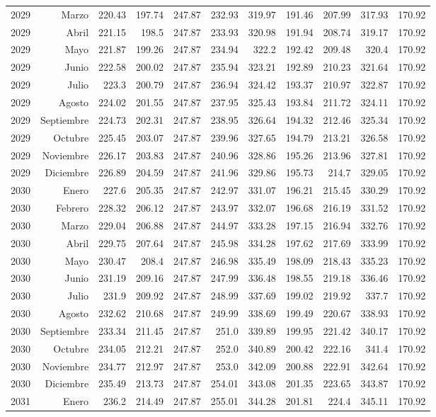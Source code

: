 \documentclass{article}%
\begin{document}
\begin{longtable}{|l r|r|r|r|r|r|r|r|r|r|}
2029&Marzo&220.43&197.74&247.87&232.93&319.97&191.46&207.99&317.93&170.92\\%
2029&Abril&221.15&198.5&247.87&233.93&320.98&191.94&208.74&319.17&170.92\\%
2029&Mayo&221.87&199.26&247.87&234.94&322.2&192.42&209.48&320.4&170.92\\%
2029&Junio&222.58&200.02&247.87&235.94&323.21&192.89&210.23&321.64&170.92\\%
2029&Julio&223.3&200.79&247.87&236.94&324.42&193.37&210.97&322.87&170.92\\%
2029&Agosto&224.02&201.55&247.87&237.95&325.43&193.84&211.72&324.11&170.92\\%
2029&Septiembre&224.73&202.31&247.87&238.95&326.64&194.32&212.46&325.34&170.92\\%
2029&Octubre&225.45&203.07&247.87&239.96&327.65&194.79&213.21&326.58&170.92\\%
2029&Noviembre&226.17&203.83&247.87&240.96&328.86&195.26&213.96&327.81&170.92\\%
2029&Diciembre&226.89&204.59&247.87&241.96&329.86&195.73&214.7&329.05&170.92\\%
2030&Enero&227.6&205.35&247.87&242.97&331.07&196.21&215.45&330.29&170.92\\%
2030&Febrero&228.32&206.12&247.87&243.97&332.07&196.68&216.19&331.52&170.92\\%
2030&Marzo&229.04&206.88&247.87&244.97&333.28&197.15&216.94&332.76&170.92\\%
2030&Abril&229.75&207.64&247.87&245.98&334.28&197.62&217.69&333.99&170.92\\%
2030&Mayo&230.47&208.4&247.87&246.98&335.49&198.09&218.43&335.23&170.92\\%
2030&Junio&231.19&209.16&247.87&247.99&336.48&198.55&219.18&336.46&170.92\\%
2030&Julio&231.9&209.92&247.87&248.99&337.69&199.02&219.92&337.7&170.92\\%
2030&Agosto&232.62&210.68&247.87&249.99&338.69&199.49&220.67&338.93&170.92\\%
2030&Septiembre&233.34&211.45&247.87&251.0&339.89&199.95&221.42&340.17&170.92\\%
2030&Octubre&234.05&212.21&247.87&252.0&340.89&200.42&222.16&341.4&170.92\\%
2030&Noviembre&234.77&212.97&247.87&253.0&342.09&200.88&222.91&342.64&170.92\\%
2030&Diciembre&235.49&213.73&247.87&254.01&343.08&201.35&223.65&343.87&170.92\\%
2031&Enero&236.2&214.49&247.87&255.01&344.28&201.81&224.4&345.11&170.92\\%

\end{longtable}
\end{document}
